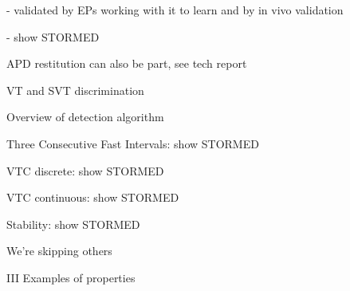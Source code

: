 	- validated by EPs working with it to learn and by in vivo validation
	
	- show STORMED

APD restitution can also be part, see tech report

VT and SVT discrimination

Overview of detection algorithm

Three Consecutive Fast Intervals: show STORMED

VTC discrete: show STORMED

VTC continuous: show STORMED

Stability: show STORMED

We're skipping others

III Examples of properties




